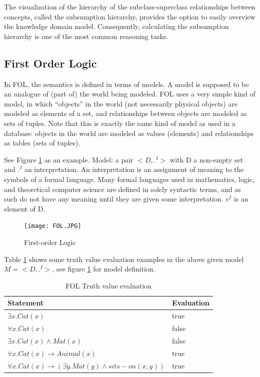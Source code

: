 The visualization of the hierarchy of the subclass-superclass relationships between concepts, called the subsumption hierarchy, provides the option to easily overview the knowledge domain model. Consequently, calculating the subsumption hierarchy is one of the most common reasoning tasks\cite{DLReasoning}.

\subsection{First Order Logic}
\label{sec:FOL}

In FOL, the semantics is defined in terms of models. A model is 
supposed to be an analogue of (part of) the world being modeled. FOL uses a very
simple kind of model, in which “objects” in the world (not necessarily physical objects)
are modeled as elements of a set, and relationships between objects are modeled as
sets of tuples\cite{OntologyLanguageTool1}.
Note that this is exactly the same kind of
model as used in a database: objects in the
world are modeled as values (elements) and
relationships as tables (sets of tuples). 

See Figure \ref{fig:FOL} as an example.
Model: a pair $<D, .^{I}>$ with D a non-empty set and 
$.^{I}$ an interpretation.
An interpretation \cite{Interpretation} is an assignment of meaning to the symbols of a formal language. Many formal languages used in mathematics, logic, and theoretical computer science are defined in solely syntactic terms, and as such do not have any meaning until they are given some interpretation. 
$v^{I}$ is an element of D.

\begin{figure}[h]
  \texttt{[image: FOL.JPG]}
  \caption{First-order Logic}
  \label{fig:FOL}
\end{figure}

Table \ref{table:FOL_truth_evaluation} shows some truth value evaluation examples in the above given model $M = <D, .^{I}>$, see figure \ref{fig:FOL} for model definition.

\begin{longtable}[h]{ p{100mm} p{30mm} }
\caption{FOL Truth value evaluation}
\label{table:FOL_truth_evaluation}\\
\hline
Statement & Evaluation\\
\hline
$\exists x.Cat(x)$ & true\\
$\forall x.Cat(x)$ & false\\
$\exists x.Cat(x) \land Mat(x)$ & false\\
$\forall x.Cat(x) \rightarrow Animal(x)$ & true\\
$\forall x.Cat(x) \rightarrow (\exists y.Mat(y) \land sits-on(x,y))$ & true\\
\hline
\end{longtable}

